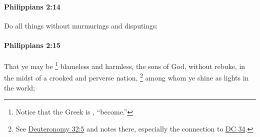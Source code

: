 		\paragraph{Philippians 2:14} %
			\label{PHILIPPIANS-2-14}

			Do all things without murmurings and disputings:

			\begin{framed}
			\scriptsize
				\begin{compactdesc}
					\item[SBLG] 
				\end{compactdesc}
			\end{framed}

		\paragraph{Philippians 2:15} %
			\label{PHILIPPIANS-2-15}

			That ye may be%
				\footnote{%
					Notice that the Greek is , ``become.''
					}
			blameless and harmless, the sons of God, without rebuke, in the midst of a crooked and perverse nation,%
				\footnote{%
					See \hyperref[DEUTERONOMY-32-5]{Deuteronomy 32:5} and notes there, especially the connection to \hyperref[DC34]{DC 34}.
					}
			among whom ye shine as lights in the world;

